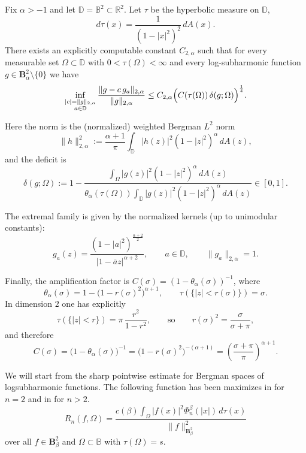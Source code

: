 \documentclass[a4paper,10pt]{amsart}
\newcommand{\D}{\mathbb{D}}
\begin{document}
\begin{numthm}\label{stabb_n2_beta}
Fix $\alpha>-1$ and let $\D=\mathbb{B}^2\subset\mathbb{R}^2$.
Let $\tau$ be the hyperbolic measure on $\D$,
\[
d\tau(x)=\frac{1}{(1-|x|^2)^2}\,dA(x).
\]
There exists an explicitly computable constant $C_{2,\alpha}$ such that for every measurable set
$\Omega\subset\D$ with $0<\tau(\Omega)<\infty$ and every log-subharmonic function
$g\in \mathbf{B}^2_{\alpha}\setminus\{0\}$ we have
\[
\inf_{\substack{|c|=\|g\|_{2,\alpha}\\ a\in\D}}
\frac{\|g-c\,g_a\|_{2,\alpha}}{\|g\|_{2,\alpha}}
\le
C_{2,\alpha}\Bigl(C(\tau(\Omega))\,\delta(g;\Omega)\Bigr)^{\frac14}.
\]

Here the norm is the (normalized) weighted Bergman $L^2$ norm
\[
\|h\|_{2,\alpha}^2 := \frac{\alpha+1}{\pi}\int_{\D} |h(z)|^2(1-|z|^2)^{\alpha}\,dA(z),
\]
and the deficit is
\[
\delta(g;\Omega)
:=
1-\frac{\displaystyle\int_\Omega |g(z)|^2(1-|z|^2)^{\alpha}\,dA(z)}
{\displaystyle\theta_\alpha(\tau(\Omega))\int_{\D}|g(z)|^2(1-|z|^2)^{\alpha}\,dA(z)}\in[0,1].
\]

The extremal family is given by the normalized kernels (up to unimodular constants):
\[
g_a(z)
=
\frac{(1-|a|^2)^{\frac{\alpha+2}{2}}}{|1-\overline{a}z|^{\alpha+2}},
\qquad a\in\D,
\qquad \|g_a\|_{2,\alpha}=1.
\]

Finally, the amplification factor is $C(\sigma)=(1-\theta_\alpha(\sigma))^{-1}$, where
\[
\theta_\alpha(\sigma)=1-\bigl(1-r(\sigma)^2\bigr)^{\alpha+1},
\qquad
\tau(\{|z|<r(\sigma)\})=\sigma.
\]
In dimension $2$ one has explicitly
\[
\tau(\{|z|<r\})=\pi\,\frac{r^2}{1-r^2},
\qquad\text{so}\qquad
r(\sigma)^2=\frac{\sigma}{\sigma+\pi},
\]
and therefore
\[
C(\sigma)=\bigl(1-\theta_\alpha(\sigma)\bigr)^{-1}
=\bigl(1-r(\sigma)^2\bigr)^{-(\alpha+1)}
=\left(\frac{\sigma+\pi}{\pi}\right)^{\alpha+1}.
\]
\end{numthm}

We will start from the sharp pointwise estimate for Bergman spaces of logsubharmonic functions.
The following function has been maximizes in \cite{RamosTilli} for $n=2$ and in \cite{kalajramos2024} for $n>2$.
\begin{equation}\label{newco}
R_n(f,\Omega)=
\frac{c(\beta) \int_\Omega  |f(x)|^2 \Phi_n^\beta(|x|) \, d\tau(x)}{\|f\|^2_{\mathbf{B}^2_\beta}}
\end{equation}
over all $f \in\mathbf{B}^2_\beta$ and $\Omega \subset \mathbb{B}$ with $\tau(\Omega) = s.$
\end{document}
